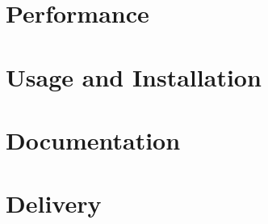 \documentclass[10pt, a4paper, twoside]{article}
\numberwithin{equation}{subsection}
\numberwithin{figure}{section}
\numberwithin{table}{section}
\begin{document}
\newpage
\section{Performance}
\label{sec:performance}


\newpage
\section{Usage and Installation}
\label{sec:usage}


\newpage
\section{Documentation}
\label{sec:documentation}


\newpage
\section{Delivery}
\label{sec:delivery}



%
%

\thispagestyle{fancy}
\mbox{}
\newpage

\end{document}
